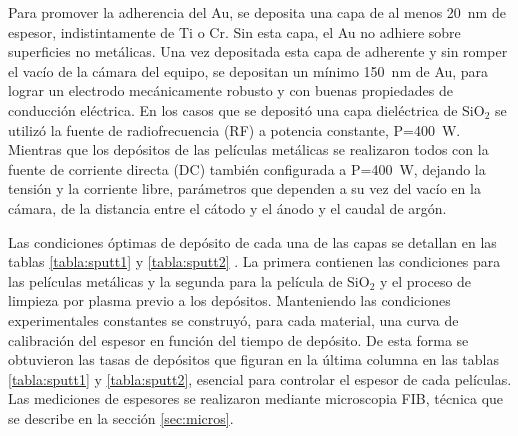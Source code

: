 			Para promover la adherencia del Au, se deposita una capa de al menos \SI{20}{\nm} de espesor, indistintamente de Ti o Cr. Sin esta capa, el Au no adhiere sobre superficies no metálicas\cite{Hieber1976}. Una vez depositada esta capa de adherente y sin romper el vacío de la cámara del equipo, se depositan un mínimo \SI{150}{\nm} de Au, para lograr un electrodo mecánicamente robusto y con buenas propiedades de conducción eléctrica. En los casos que se depositó una capa dieléctrica de SiO$_2$ se utilizó la fuente de radiofrecuencia (RF) a potencia constante, P=\SI{400}{W}. Mientras que los depósitos de las películas metálicas se realizaron todos con la fuente de corriente directa (DC) también configurada a P=\SI{400}{W}, dejando la tensión y la corriente libre, parámetros que dependen a su vez del vacío en la cámara, de la distancia entre el cátodo y el ánodo y el caudal de argón. 

			
			Las condiciones óptimas de depósito de cada una de las capas se detallan en las tablas \ref{tabla:sputt1} y \ref{tabla:sputt2} . La primera contienen las condiciones para las películas metálicas y la segunda para la película de SiO$_2$ y el proceso de limpieza por plasma previo a los depósitos. Manteniendo las condiciones experimentales constantes se construyó, para cada material, una curva de calibración del espesor en función del tiempo de depósito. De esta forma se obtuvieron las tasas de depósitos que figuran en la última columna en las tablas \ref{tabla:sputt1} y \ref{tabla:sputt2}, esencial para controlar el espesor de cada películas. Las mediciones de espesores se realizaron mediante microscopia FIB, técnica que se describe en la sección \ref{sec:micros}.

